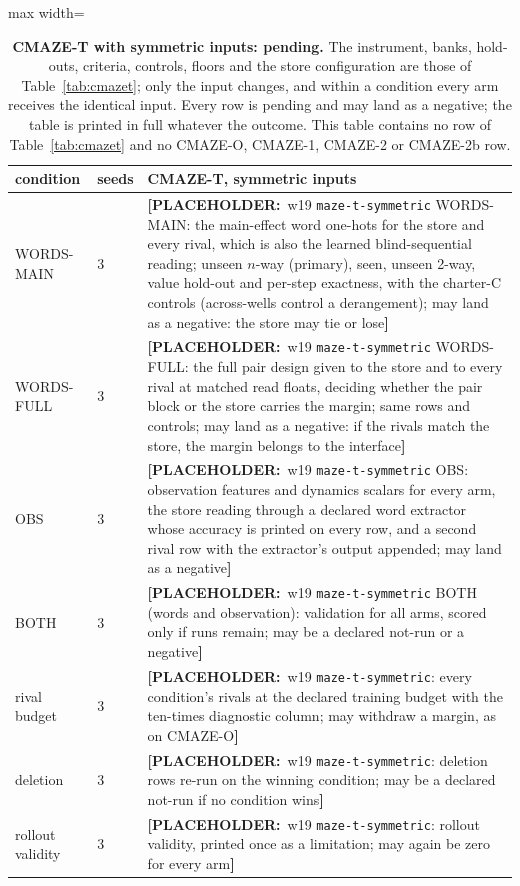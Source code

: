 \documentclass{article} %
\newcommand{\PLACEHOLDER}[1]{{\color{red}\textbf{[PLACEHOLDER:}~#1\textbf{]}}}
\begin{document}
\begin{table}[h]
\centering\scriptsize
\caption{\textbf{CMAZE-T with symmetric inputs: pending.} The %
instrument, banks, hold-outs, criteria, controls, floors and the store configuration are those of
Table~\ref{tab:cmazet}; only the input changes, and within a condition every arm receives the
identical input. Every row is pending and may land as a negative; the table is printed in full
whatever the outcome. This table contains no row of Table~\ref{tab:cmazet} and no CMAZE-O,
CMAZE-1, CMAZE-2 or CMAZE-2b row.}
\label{tab:cmazet-sym}
\setlength{\tabcolsep}{2pt}
\begin{adjustbox}{max width=\linewidth}\begin{tabular}{p{1.9cm}p{1.2cm}p{10.0cm}}
\toprule
condition & seeds & CMAZE-T, symmetric inputs \\
\midrule
WORDS-MAIN & 3 & \PLACEHOLDER{w19 \texttt{maze-t-symmetric} WORDS-MAIN: the main-effect word one-hots for the store and every rival, which is also the learned blind-sequential reading; unseen $n$-way (primary), seen, unseen 2-way, value hold-out and per-step exactness, with the charter-C controls (across-wells control a derangement); may land as a negative: the store may tie or lose} \\
WORDS-FULL & 3 & \PLACEHOLDER{w19 \texttt{maze-t-symmetric} WORDS-FULL: the full pair design given to the store and to every rival at matched read floats, deciding whether the pair block or the store carries the margin; same rows and controls; may land as a negative: if the rivals match the store, the margin belongs to the interface} \\
OBS & 3 & \PLACEHOLDER{w19 \texttt{maze-t-symmetric} OBS: observation features and dynamics scalars for every arm, the store reading through a declared word extractor whose accuracy is printed on every row, and a second rival row with the extractor's output appended; may land as a negative} \\
BOTH & 3 & \PLACEHOLDER{w19 \texttt{maze-t-symmetric} BOTH (words and observation): validation for all arms, scored only if runs remain; may be a declared not-run or a negative} \\
rival budget & 3 & \PLACEHOLDER{w19 \texttt{maze-t-symmetric}: every condition's rivals at the declared training budget with the ten-times diagnostic column; may withdraw a margin, as on CMAZE-O} \\
deletion & 3 & \PLACEHOLDER{w19 \texttt{maze-t-symmetric}: deletion rows re-run on the winning condition; may be a declared not-run if no condition wins} \\
rollout validity & 3 & \PLACEHOLDER{w19 \texttt{maze-t-symmetric}: rollout validity, printed once as a limitation; may again be zero for every arm} \\
\bottomrule
\end{tabular}\end{adjustbox}
\end{table}
\end{document}
